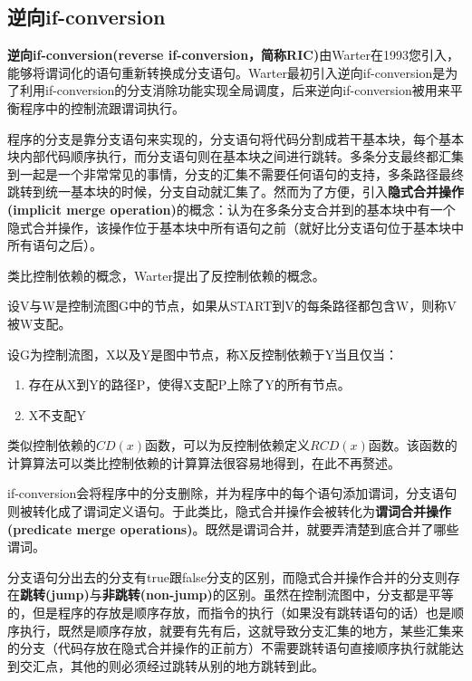 \subsection{逆向if-conversion}

\textbf{逆向if-conversion(reverse if-conversion，简称RIC)}由Warter在1993您引入，能够将谓词化的语句重新转换成分支语句。Warter最初引入逆向if-conversion是为了利用if-conversion的分支消除功能实现全局调度，后来逆向if-conversion被用来平衡程序中的控制流跟谓词执行。

程序的分支是靠分支语句来实现的，分支语句将代码分割成若干基本块，每个基本块内部代码顺序执行，而分支语句则在基本块之间进行跳转。多条分支最终都汇集到一起是一个非常常见的事情，分支的汇集不需要任何语句的支持，多条路径最终跳转到统一基本块的时候，分支自动就汇集了。然而为了方便，引入\textbf{隐式合并操作(implicit merge operation)}的概念：认为在多条分支合并到的基本块中有一个隐式合并操作，该操作位于基本块中所有语句之前（就好比分支语句位于基本块中所有语句之后）。

类比控制依赖的概念，Warter提出了反控制依赖的概念。

\begin{definition}[支配(dominate)]
设V与W是控制流图G中的节点，如果从START到V的每条路径都包含W，则称V被W支配。
\end{definition}

\begin{definition}
设G为控制流图，X以及Y是图中节点，称X反控制依赖于Y当且仅当：
\begin{enumerate}
\item 存在从X到Y的路径P，使得X支配P上除了Y的所有节点。
\item X不支配Y
\end{enumerate}
\end{definition}
类似控制依赖的$CD\left(x\right)$函数，可以为反控制依赖定义$RCD\left(x\right)$函数。该函数的计算算法可以类比控制依赖的计算算法很容易地得到，在此不再赘述。

if-conversion会将程序中的分支删除，并为程序中的每个语句添加谓词，分支语句则被转化成了谓词定义语句。于此类比，隐式合并操作会被转化为\textbf{谓词合并操作(predicate merge operations)}。既然是谓词合并，就要弄清楚到底合并了哪些谓词。

分支语句分出去的分支有true跟false分支的区别，而隐式合并操作合并的分支则存在\textbf{跳转(jump)}与\textbf{非跳转(non-jump)}的区别。虽然在控制流图中，分支都是平等的，但是程序的存放是顺序存放，而指令的执行（如果没有跳转语句的话）也是顺序执行，既然是顺序存放，就要有先有后，这就导致分支汇集的地方，某些汇集来的分支（代码存放在隐式合并操作的正前方）不需要跳转语句直接顺序执行就能达到交汇点，其他的则必须经过跳转从别的地方跳转到此。

